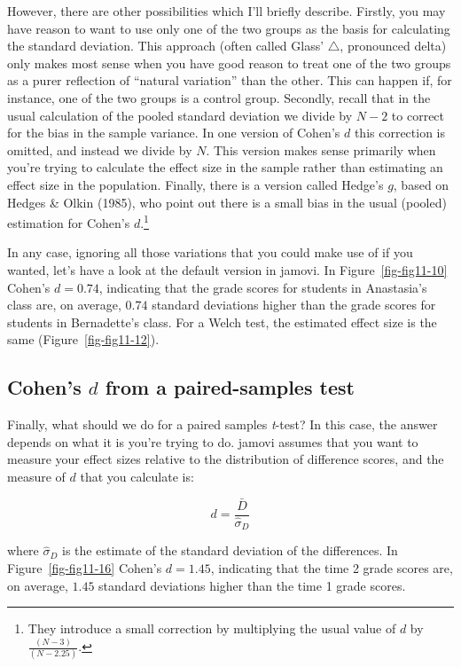 \documentclass[
  a4paper,
]{book}
\begin{document}
However, there are other possibilities which I'll briefly describe.
Firstly, you may have reason to want to use only one of the two groups
as the basis for calculating the standard deviation. This approach
(often called Glass' \(\triangle\), pronounced delta) only makes most
sense when you have good reason to treat one of the two groups as a
purer reflection of ``natural variation'' than the other. This can
happen if, for instance, one of the two groups is a control group.
Secondly, recall that in the usual calculation of the pooled standard
deviation we divide by \(N - 2\) to correct for the bias in the sample
variance. In one version of Cohen's \(d\) this correction is omitted,
and instead we divide by \(N\). This version makes sense primarily when
you're trying to calculate the effect size in the sample rather than
estimating an effect size in the population. Finally, there is a version
called Hedge's \(g\), based on Hedges \& Olkin (1985), who point out
there is a small bias in the usual (pooled) estimation for Cohen's
\(d\).\footnote{They introduce a small correction by multiplying the
  usual value of \(d\) by \(\frac{(N - 3)}{(N - 2.25)}\).}

In any case, ignoring all those variations that you could make use of if
you wanted, let's have a look at the default version in jamovi. In
Figure~\ref{fig-fig11-10} Cohen's \(d = 0.74\), indicating that the
grade scores for students in Anastasia's class are, on average, \(0.74\)
standard deviations higher than the grade scores for students in
Bernadette's class. For a Welch test, the estimated effect size is the
same (Figure~\ref{fig-fig11-12}).

\hypertarget{cohens-d-from-a-paired-samples-test}{%
\subsection{\texorpdfstring{Cohen's \(d\) from a paired-samples
test}{Cohen's d from a paired-samples test}}\label{cohens-d-from-a-paired-samples-test}}

Finally, what should we do for a paired samples \emph{t}-test? In this
case, the answer depends on what it is you're trying to do. jamovi
assumes that you want to measure your effect sizes relative to the
distribution of difference scores, and the measure of \(d\) that you
calculate is:

\[d=\frac{\bar{D}}{\hat{\sigma}_D}\]

where \(\hat{\sigma}_D\) is the estimate of the standard deviation of
the differences. In Figure~\ref{fig-fig11-16} Cohen's \(d = 1.45\),
indicating that the time 2 grade scores are, on average, \(1.45\)
standard deviations higher than the time 1 grade scores.
\end{document}
